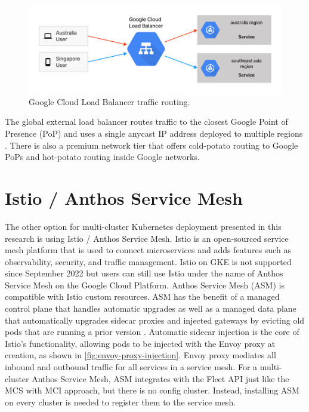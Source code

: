 \begin{figure}
	\centering
	\includegraphics[width=1\textwidth]{assets/diagrams/gclb-diagram.png}
	\caption{Google Cloud Load Balancer traffic routing.}
	\label{fig:gclb-diagram}
\end{figure}

The global external load balancer routes traffic to the closest Google Point of Presence (PoP) and uses a single anycast IP address deployed to multiple regions \citep{google-mci-2023}. There is also a premium network tier that offers cold-potato routing to Google PoPs and hot-potato routing inside Google networks.

\section{Istio / Anthos Service Mesh}
\label{sec:istio}
The other option for multi-cluster Kubernetes deployment presented in this research is using Istio / Anthos Service Mesh. Istio is an open-sourced service mesh platform that is used to connect microservices and adds features such as observability, security, and traffic management. Istio on GKE is not supported since September 2022 but users can still use Istio under the name of Anthos Service Mesh on the Google Cloud Platform. Anthos Service Mesh (ASM) is compatible with Istio custom resources. ASM has the benefit of a managed control plane that handles automatic upgrades as well as a managed data plane that automatically upgrades sidecar proxies and injected gateways by evicting old pods that are running a prior version \citep{google-asm-2023}. Automatic sidecar injection is the core of Istio's functionality, allowing pods to be injected with the Envoy proxy at creation, as shown in \autoref{fig:envoy-proxy-injection}. Envoy proxy mediates all inbound and outbound traffic for all services in a service mesh. For a multi-cluster Anthos Service Mesh, ASM integrates with the Fleet API just like the MCS with MCI approach, but there is no config cluster. Instead, installing ASM on every cluster is needed to register them to the service mesh.

